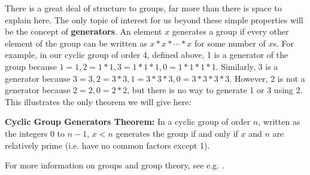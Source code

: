 \documentclass[man,10pt]{apa6}
\begin{document}
There is a great deal of structure to groups, far more than there is space to explain here. The only topic of interest for us beyond these simple properties will be the concept of \textbf{generators}. An element $x$ generates a group if every other element of the group can be written as $x*x*\cdots*x$ for some number of $x$s. For example, in our cyclic group of order 4, defined above, 1 is a generator of the group because $1 = 1, 2 = 1 * 1, 3 = 1 * 1 * 1, 0 = 1 * 1 * 1 * 1$. Similarly, 3 is a generator because $3 = 3, 2 = 3 * 3, 1 = 3 * 3 * 3, 0 = 3 * 3 * 3 * 3$. However, 2 is not a generator because $2 = 2, 0 = 2 * 2$, but there is no way to generate 1 or 3 using 2. This illustrates the only theorem we will give here: \par
\textbf{Cyclic Group Generators Theorem:} In a cyclic group of order $n$, written as the integers $0$ to $n-1$, $x < n$ generates the group if and only if $x$ and $n$ are relatively prime (i.e. have no common factors except 1). \par 
For more information on groups and group theory, see e.g. \cite{Lang2002}.
\onecolumn
\clearpage
\end{document}
